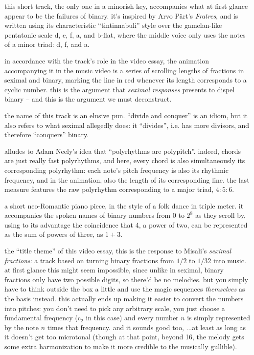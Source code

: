 \documentclass[a4paper, 12pt]{report}
\begin{document}

this short track, the only one in a minorish key, accompanies what at first glance appear to be the failures of binary. it's inspired by Arvo P\"art's {\it Fratres}, and is written using its characteristic ``tintinnabuli'' style over the gamelan-like pentatonic scale {\sc d}, {\sc e}, {\sc f}, {\sc a}, and {\sc b}-flat, where the middle voice only uses the notes of a minor triad: {\sc d}, {\sc f}, and {\sc a}.

in accordance with the track's role in the video essay, the animation accompanying it in the music video is a series of scrolling lengths of fractions in seximal and binary, marking the line in red whenever its length corresponds to a cyclic number. this is the argument that {\it seximal responses} presents to dispel binary -- and this is the argument we must deconstruct.

the name of this track is an elusive pun. ``divide and conquer'' is an idiom, but it also refers to what seximal allegedly does: it ``divides'', i.e. has more divisors, and therefore ``conquers'' binary.


alludes to Adam Neely's idea that ``polyrhythms are polypitch''. indeed, chords are just really fast polyrhythms, and here, every chord is also simultaneously its corresponding polyrhythm: each note's pitch frequency is also its rhythmic frequency, and in the animation, also the length of its corresponding line. the last measure features the raw polyrhythm corresponding to a major triad, $4:5:6$.


a short neo-Romantic piano piece, in the style of a folk dance in triple meter. it accompanies the spoken names of binary numbers from 0 to $2^8$ as they scroll by, using to its advantage the coincidence that 4, a power of two, can be represented as the sum of powers of three, as $1 + 3$.


the ``title theme'' of this video essay, this is the response to Misali's {\it seximal fractions}: a track based on turning binary fractions from $1/2$ to $1/32$ into music. at first glance this might seem impossible, since unlike in seximal, binary fractions only have two possible digits, so there'd be no melodies. but you simply have to think outside the box a little and use the magic sequences \emph{themselves} as the basis instead. this actually ends up making it easier to convert the numbers into pitches: you don't need to pick any arbitrary scale, you just choose a fundamental frequency ({\sc c$_2$} in this case) and every number $n$ is simply represented by the note $n$ times that frequency. and it sounds good too, ...at least as long as it doesn't get too microtonal (though at that point, beyond 16, the melody gets some extra harmonization to make it more credible to the musically gullible).
\end{document}

